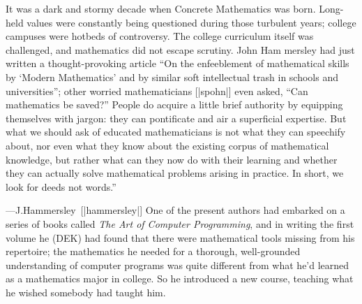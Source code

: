 It was a dark and stormy decade when Concrete Mathematics was born.
Long-held values were constantly being questioned during those turbulent
years; college campuses were hotbeds of controversy. The college curriculum
itself was challenged, and mathematics did not escape scrutiny. John Ham%
mersley had just written a thought-provoking article ``On the enfeeblement of
mathematical skills by `Modern Mathematics' and by similar soft intellectual
trash in schools and universities''\thinspace[|hammersley|]; %
other worried mathematicians [|spohn|]
even asked, ``Can mathematics be saved?''
\g\noindent{}People do acquire a little brief authority by equipping themselves with
jargon: they can pontificate and air a superficial expertise. But what we should
ask of educated mathematicians is not what they can speechify about, nor
even what they know about the existing corpus of mathematical knowledge,
but rather what can they now do with their learning and whether
they can actually solve
mathematical problems arising in practice. In short, we look for deeds not words.''
\par\hfill\kern-15pt\dash---J.\thinspace Hammersley~[|hammersley|]\g
 One of the present authors had
embarked on a series of books called {\sl The Art of Computer
 \null Programming}, and
in writing the first volume he (DEK) had found that there were
 \null mathematical
tools missing from his repertoire; the mathematics he needed for a thorough,
well-grounded understanding of computer programs was quite different from
what he'd learned as a mathematics major in college. So he introduced a new
course, teaching what he wished somebody had taught him.

